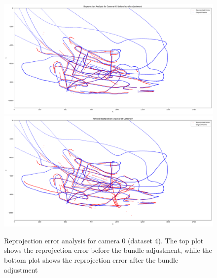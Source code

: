 \documentclass[11pt]{article}
\begin{document}
\begin{figure}[h]
    \centering
    \includegraphics[width=\textwidth]{../plots/dataset4/reprojection_analysis_camera_0_before_ba_.png}
    \includegraphics[width=\textwidth]{../plots/dataset4/reprojection_analysis_camera_0.png}
    \caption{Reprojection error analysis for camera 0 (dataset 4). The top plot shows the reprojection error before the bundle adjustment, while the bottom plot shows the reprojection error after the bundle adjustment}
    \label{fig:reprojection_analysis}
\end{figure}
\end{document}
